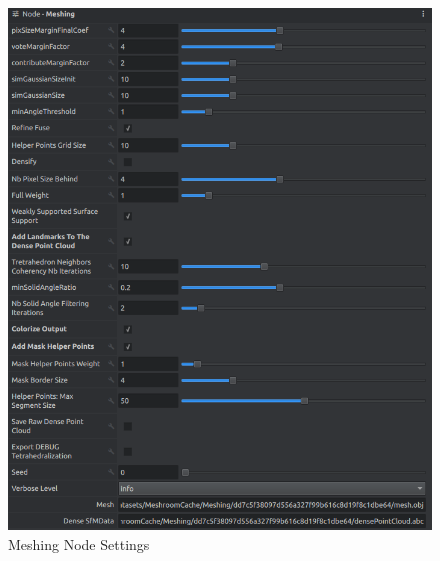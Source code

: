 \documentclass[12pt]{report}
\begin{document}
\begin{figure}[H]%
  \centering
  \includegraphics[width=1\textwidth]{meshing_2.png}
\caption{Meshing Node Settings}
\label{fig:meshing2_big}
\end{figure}



\end{document}
